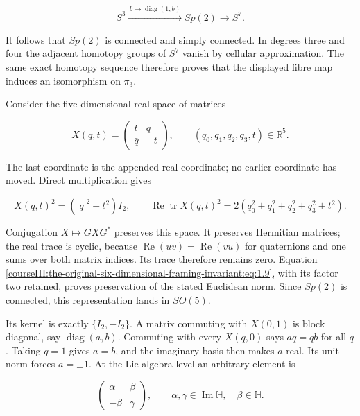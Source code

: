 \begin{equation}
S^3\xrightarrow{\,b\mapsto\operatorname{diag}(1,b)\,}
 Sp(2)\longrightarrow S^7.
 \label{courseIII:the-original-six-dimensional-framing-invariant:eq:1.7}
\end{equation}

It follows that \(Sp(2)\) is connected and simply connected. In degrees three and four the adjacent homotopy groups of \(S^7\) vanish by cellular approximation. The same exact homotopy sequence therefore proves that the displayed fibre map induces an isomorphism on \(\pi_3\).

Consider the five-dimensional real space of matrices

\begin{equation}
X(q,t)=
 \begin{pmatrix}t&q\\\bar q&-t\end{pmatrix},
 \qquad(q_0,q_1,q_2,q_3,t)\in\mathbb R^5.
 \label{courseIII:the-original-six-dimensional-framing-invariant:eq:1.8}
\end{equation}

The last coordinate is the appended real coordinate; no earlier coordinate has moved. Direct multiplication gives

\begin{equation}
X(q,t)^2=(|q|^2+t^2)I_2,\qquad
 \operatorname{Re}\operatorname{tr}X(q,t)^2
       =2(q_0^2+q_1^2+q_2^2+q_3^2+t^2).
 \label{courseIII:the-original-six-dimensional-framing-invariant:eq:1.9}
\end{equation}

Conjugation \(X\mapsto GXG^*\) preserves this space. It preserves Hermitian matrices; the real trace is cyclic, because \(\operatorname{Re}(uv)=\operatorname{Re}(vu)\) for quaternions and one sums over both matrix indices. Its trace therefore remains zero. Equation \eqref{courseIII:the-original-six-dimensional-framing-invariant:eq:1.9}, with its factor two retained, proves preservation of the stated Euclidean norm. Since \(Sp(2)\) is connected, this representation lands in \(SO(5)\).

Its kernel is exactly \(\{I_2,-I_2\}\). A matrix commuting with \(X(0,1)\) is block diagonal, say \(\operatorname{diag}(a,b)\). Commuting with every \(X(q,0)\) says \(aq=qb\) for all \(q\). Taking \(q=1\) gives \(a=b\), and the imaginary basis then makes \(a\) real. Its unit norm forces \(a=\pm1\). At the Lie-algebra level an arbitrary element is

\begin{equation}
\begin{pmatrix}\alpha&\beta\\-\bar\beta&\gamma\end{pmatrix},
 \qquad \alpha,\gamma\in\operatorname{Im}\mathbb H,\quad
 \beta\in\mathbb H.
 \label{courseIII:the-original-six-dimensional-framing-invariant:eq:1.10}
\end{equation}

